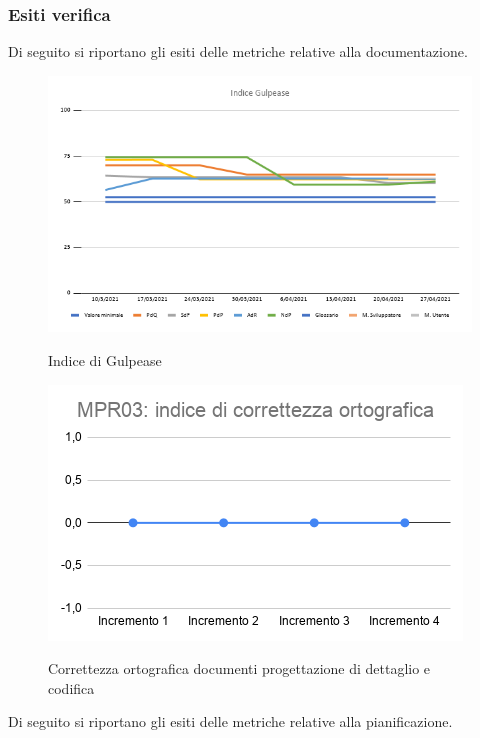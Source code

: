 \subsubsection{Esiti verifica}
Di seguito si riportano gli esiti delle metriche relative alla documentazione.
\begin{figure}[h]
	\centering
	\includegraphics[scale=0.5]{Immagini/GulpeaseDettaglio}\\
	\caption{Indice di Gulpease}
	\label{fig:GulpeasePDettaglio}
\end{figure}
\begin{figure}[h]
	\centering
	\includegraphics[scale=0.6]{Immagini/MPR03_cortograficadettaglio.png}\\
	\caption{Correttezza ortografica documenti progettazione di dettaglio e codifica}
	\label{fig:CortOrtograficaPDettaglio}
\end{figure}
\newpage
{}
Di seguito si riportano gli esiti delle metriche relative alla pianificazione.
